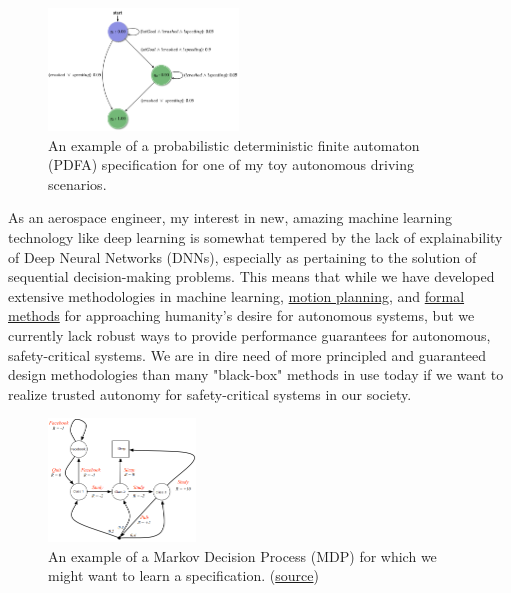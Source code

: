 \begin{figure}
  \vspace{-0.7cm}
  \begin{center}
    \includegraphics[width=0.45\textwidth]{Figures/PDFA.png}
  \end{center}
  \caption{An example of a probabilistic deterministic finite automaton (PDFA) specification for one of my toy autonomous driving scenarios.}
  \label{fig: driving_pdfa_spec}
\end{figure}

As an aerospace engineer, my interest in new, amazing machine learning technology like deep learning is somewhat tempered by the lack of explainability of Deep Neural Networks (DNNs), especially as pertaining to the solution of sequential decision-making problems. This means that while we have developed extensive methodologies in machine learning, \href{https://en.wikipedia.org/wiki/Motion_planning}{motion planning}, and \href{https://en.wikipedia.org/wiki/Formal_methods}{formal methods} for approaching humanity's desire for autonomous systems, but we currently lack robust ways to provide performance guarantees for autonomous, safety-critical systems. We are in dire need of more principled and guaranteed design methodologies than many "black-box" methods in use today if we want to realize trusted autonomy for safety-critical systems in our society.

\begin{figure}
  \vspace{-0.7cm}
  \begin{center}
    \includegraphics[width=0.35\textwidth]{Figures/MDP.png}
  \end{center}
  \caption{An example of a Markov Decision Process (MDP) for which we might want to learn a specification. (\href{https://medium.com/@bibekchaudhary/markov-decision-process-mdp-simplified-1ae44cf53cc1}{source})}
  \label{fig: mdp}
  \vspace{-0.3cm}
\end{figure}

